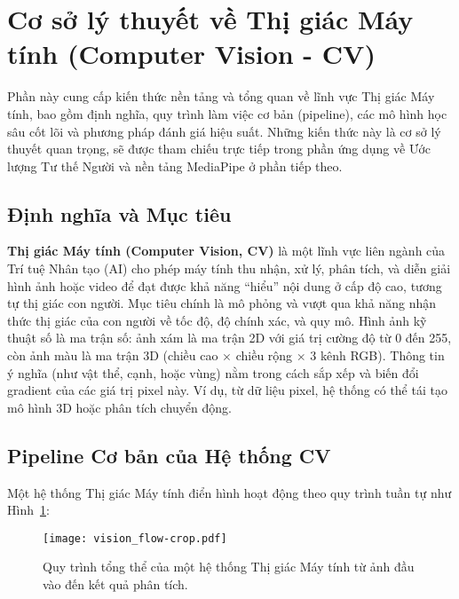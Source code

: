 \section{Cơ sở lý thuyết về Thị giác Máy tính (Computer Vision - CV)}

Phần này cung cấp kiến thức nền tảng và tổng quan về lĩnh vực Thị giác Máy tính, bao gồm định nghĩa, quy trình làm việc cơ bản (pipeline), các mô hình học sâu cốt lõi và phương pháp đánh giá hiệu suất. Những kiến thức này là cơ sở lý thuyết quan trọng, sẽ được tham chiếu trực tiếp trong phần ứng dụng về Ước lượng Tư thế Người và nền tảng MediaPipe ở phần tiếp theo.

\subsection{Định nghĩa và Mục tiêu}
\textbf{Thị giác Máy tính (Computer Vision, CV)} là một lĩnh vực liên ngành của Trí tuệ Nhân tạo (AI) cho phép máy tính thu nhận, xử lý, phân tích, và diễn giải hình ảnh hoặc video để đạt được khả năng ``hiểu'' nội dung ở cấp độ cao, tương tự thị giác con người. Mục tiêu chính là mô phỏng và vượt qua khả năng nhận thức thị giác của con người về tốc độ, độ chính xác, và quy mô.\autocite{szeliski2010} Hình ảnh kỹ thuật số là ma trận số: ảnh xám là ma trận 2D với giá trị cường độ từ 0 đến 255, còn ảnh màu là ma trận 3D (chiều cao $\times$ chiều rộng $\times$ 3 kênh RGB). Thông tin ý nghĩa (như vật thể, cạnh, hoặc vùng) nằm trong cách sắp xếp và biến đổi gradient của các giá trị pixel này.\autocite{lowe1999} Ví dụ, từ dữ liệu pixel, hệ thống có thể tái tạo mô hình 3D hoặc phân tích chuyển động.

\subsection{Pipeline Cơ bản của Hệ thống CV}
Một hệ thống Thị giác Máy tính điển hình hoạt động theo quy trình tuần tự như Hình~\ref{fig:cv_pipeline}:

\begin{figure}[h]
    \centering
    \texttt{[image: vision\_flow-crop.pdf]}
    \caption{Quy trình tổng thể của một hệ thống Thị giác Máy tính từ ảnh đầu vào đến kết quả phân tích.}
    \label{fig:cv_pipeline}
\end{figure}


